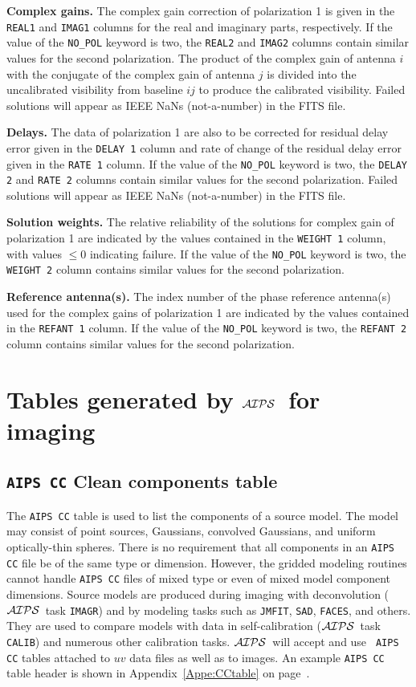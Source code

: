 \documentclass[twoside]{article}
\newcommand{\AIPS}{{$\cal AIPS\/$}}
\begin{document}
{\bf Complex gains.} The complex gain correction of polarization 1 is
given in the {\tt REAL1} and {\tt IMAG1} columns for the real and
imaginary parts, respectively.  If the value of the {\tt NO\_POL}
keyword is two, the {\tt REAL2} and {\tt IMAG2} columns contain
similar values for the second polarization.  The product of the
complex gain of antenna $i$ with the conjugate of the complex gain of
antenna $j$ is divided into the uncalibrated visibility from baseline
$ij$ to produce the calibrated visibility.  Failed solutions will
appear as IEEE NaNs (not-a-number) in the FITS file.

{\bf Delays.} The data of polarization 1 are also to be corrected for
residual delay error given in the {\tt DELAY 1} column and rate of
change of the residual delay error given in the {\tt RATE 1} column.
If the value of the {\tt NO\_POL} keyword is two, the {\tt DELAY 2}
and {\tt RATE 2} columns contain similar values for the second
polarization.  Failed solutions will appear as IEEE NaNs
(not-a-number) in the FITS file.

{\bf Solution weights.} The relative reliability of the solutions for
complex gain of polarization 1 are indicated by the values contained
in the {\tt WEIGHT 1} column, with values $\leq 0$ indicating failure.
If the value of the {\tt NO\_POL} keyword is two, the {\tt WEIGHT 2}
column contains similar values for the second polarization.

{\bf Reference antenna(s).} The index number of the phase reference
antenna(s) used for the complex gains of polarization 1 are indicated
by the values contained in the {\tt REFANT 1} column.  If the value of
the {\tt NO\_POL} keyword is two, the {\tt REFANT 2} column contains
similar values for the second polarization.

\vfill\eject
\section{Tables generated by \AIPS\ for imaging}
\label{s:image}

\subsection{{\tt AIPS CC} Clean components table}
\label{s:CC}

The {\tt AIPS CC} table is used to list the components of a source
model.  The model may consist of point sources, Gaussians, convolved
Gaussians, and uniform optically-thin spheres.  There is no
requirement that all components in an {\tt AIPS CC} file be of the
same type or dimension.  However, the gridded modeling routines cannot
handle {\tt AIPS CC} files of mixed type or even of mixed model
component dimensions.  Source models are produced during imaging with
deconvolution (\AIPS\ task {\tt IMAGR}) and by modeling tasks such as
{\tt JMFIT}, {\tt SAD}, {\tt FACES}, and others.  They are used to
compare models with data in self-calibration (\AIPS\ task {\tt CALIB})
and numerous other calibration tasks.  \AIPS\ will accept and use {\tt
AIPS CC} tables attached to $uv$ data files as well as to images.  An
example {\tt AIPS CC} table header is shown in
Appendix~\ref{Appe:CCtable} on page~\pageref{Appe:CCtable}.
\end{document}
